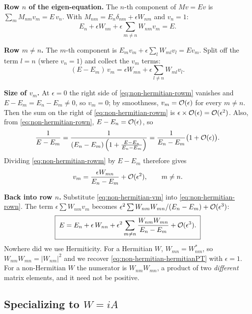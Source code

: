 \textbf{Row $n$ of the eigen-equation.} The $n$-th component of $Mv=Ev$ is $\sum_m M_{nm}v_m = E\,v_n$. With $M_{nm} = E_n\delta_{nm}+\epsilon W_{nm}$ and $v_n=1$:
\begin{equation}
E_n + \epsilon W_{nn} + \epsilon\sum_{m\ne n}W_{nm}v_m = E.
\label{eq:non-hermitian-rown}
\end{equation}

\textbf{Row $m\ne n$.} The $m$-th component is $E_mv_m + \epsilon\sum_{l}W_{ml}v_l = Ev_m$. Split off the term $l=n$ (where $v_n=1$) and collect the $v_m$ terms:
\begin{equation}
(E-E_m)\,v_m = \epsilon W_{mn} + \epsilon\sum_{l\ne n}W_{ml}v_l .
\label{eq:non-hermitian-rowm}
\end{equation}

\textbf{Size of $v_m$.} At $\epsilon=0$ the right side of \eqref{eq:non-hermitian-rowm} vanishes and $E-E_m = E_n-E_m\ne0$, so $v_m=0$; by smoothness, $v_m = \mathcal{O}(\epsilon)$ for every $m\ne n$. Then the sum on the right of \eqref{eq:non-hermitian-rowm} is $\epsilon\times\mathcal{O}(\epsilon)=\mathcal{O}(\epsilon^2)$. Also, from \eqref{eq:non-hermitian-rown}, $E-E_n=\mathcal{O}(\epsilon)$, so
\begin{equation}
\frac{1}{E-E_m} = \frac{1}{(E_n-E_m)\left(1+\frac{E-E_n}{E_n-E_m}\right)} = \frac{1}{E_n-E_m}\bigl(1+\mathcal{O}(\epsilon)\bigr).
\end{equation}
Dividing \eqref{eq:non-hermitian-rowm} by $E-E_m$ therefore gives
\begin{equation}
v_m = \frac{\epsilon W_{mn}}{E_n-E_m} + \mathcal{O}(\epsilon^2), \qquad m\ne n.
\label{eq:non-hermitian-vm}
\end{equation}

\textbf{Back into row $n$.} Substitute \eqref{eq:non-hermitian-vm} into \eqref{eq:non-hermitian-rown}. The term $\epsilon\sum W_{nm}v_m$ becomes $\epsilon^2\sum W_{nm}W_{mn}/(E_n-E_m)+\mathcal{O}(\epsilon^3)$:
\begin{equation}
\boxed{\;E = E_n + \epsilon\,W_{nn} + \epsilon^2\sum_{m\ne n}\frac{W_{nm}W_{mn}}{E_n-E_m} + \mathcal{O}(\epsilon^3).\;}
\label{eq:non-hermitian-generalPT}
\end{equation}
Nowhere did we use Hermiticity. For a Hermitian $W$, $W_{mn}=W_{nm}^*$, so $W_{nm}W_{mn}=|W_{nm}|^2$ and we recover \eqref{eq:non-hermitian-hermitianPT} with $\epsilon=1$. For a non-Hermitian $W$ the numerator is $W_{nm}W_{mn}$, a product of two \emph{different} matrix elements, and it need not be positive.

\subsection{Specializing to $W=iA$}

